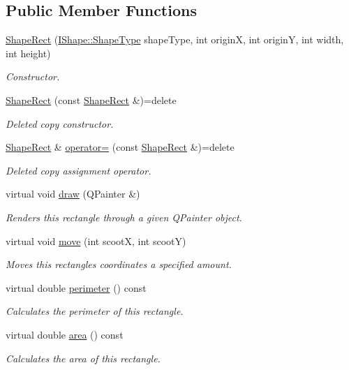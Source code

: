 \subsection*{Public Member Functions}
\begin{DoxyCompactItemize}
\item 
\mbox{\hyperlink{class_shape_rect_ac5b445c75c6e4a14c8bdbe0fad5ac81a}{Shape\+Rect}} (\mbox{\hyperlink{class_i_shape_a8f50993477b5ddb44c0547ef3d547cdc}{I\+Shape\+::\+Shape\+Type}} shape\+Type, int originX, int originY, int width, int height)
\begin{DoxyCompactList}\small\item\em Constructor. \end{DoxyCompactList}\item 
\mbox{\hyperlink{class_shape_rect_a5e2f220e75b55cb9c0405c4820f679f6}{Shape\+Rect}} (const \mbox{\hyperlink{class_shape_rect}{Shape\+Rect}} \&)=delete
\begin{DoxyCompactList}\small\item\em Deleted copy constructor. \end{DoxyCompactList}\item 
\mbox{\hyperlink{class_shape_rect}{Shape\+Rect}} \& \mbox{\hyperlink{class_shape_rect_aa5fd1e13562412ebceb977be0a455b18}{operator=}} (const \mbox{\hyperlink{class_shape_rect}{Shape\+Rect}} \&)=delete
\begin{DoxyCompactList}\small\item\em Deleted copy assignment operator. \end{DoxyCompactList}\item 
virtual void \mbox{\hyperlink{class_shape_rect_acc35ed70d85acd941b56cc505b9fae6c}{draw}} (Q\+Painter \&)
\begin{DoxyCompactList}\small\item\em Renders this rectangle through a given Q\+Painter object. \end{DoxyCompactList}\item 
virtual void \mbox{\hyperlink{class_shape_rect_a79fcc5998d54d1bfd851646479804b32}{move}} (int scootX, int scootY)
\begin{DoxyCompactList}\small\item\em Moves this rectangle\textquotesingle{}s coordinates a specified amount. \end{DoxyCompactList}\item 
virtual double \mbox{\hyperlink{class_shape_rect_a7dba46671dfd64188b37bff161d3bb89}{perimeter}} () const
\begin{DoxyCompactList}\small\item\em Calculates the perimeter of this rectangle. \end{DoxyCompactList}\item 
virtual double \mbox{\hyperlink{class_shape_rect_a87e891eaa6975fc73f4148427076812e}{area}} () const
\begin{DoxyCompactList}\small\item\em Calculates the area of this rectangle. \end{DoxyCompactList}\end{DoxyCompactItemize}

